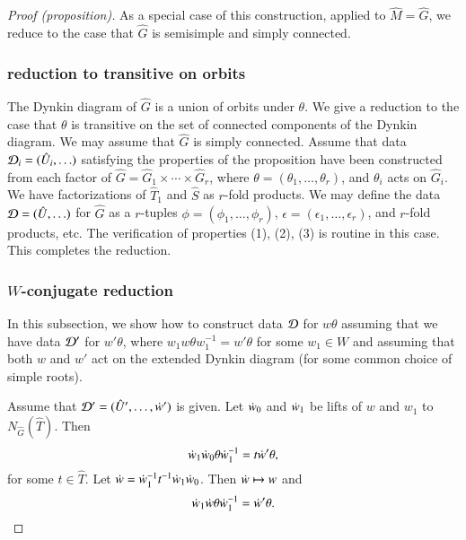 \begin{proof}[Proof (proposition)]
As a special case of this construction, applied to $\hat M=\hat G$, we reduce
to the case that $\hat G$ is semisimple and simply connected.

\subsubsection{reduction to transitive on orbits}

  The Dynkin diagram of $\hat G$ is a union of orbits under $\theta$.
  We give a reduction to the case that $\theta$ is transitive on
  the set of connected components of the Dynkin diagram. We may assume
  that $\hat G$ is simply connected.
  Assume that data $\mathcal D_i=(\hat U_i,\ldots)$ satisfying the properties of the
  proposition have been
  constructed from each factor of
  $\hat G = \hat G_1\times\cdots\times \hat G_r$, where $\theta=(\theta_1,\ldots,\theta_r)$,
  and $\theta_i$ acts on $\hat G_i$.  We have
  factorizations of $\hat T_1$ and $\hat S$ as $r$-fold products.  We
  may define the data $\mathcal D=(\hat U,\ldots)$ for $\hat G$ as a
  $r$-tuples $\phi = (\phi_1,\ldots,\phi_r)$,
  $\epsilon = (\epsilon_{1},\ldots,\epsilon_{r})$, and $r$-fold products, etc.  The
  verification of properties (1), (2), (3) is routine in this case.
  This completes the reduction.

\subsubsection{$W$-conjugate reduction}\label{sec:conjred}

In this subsection, we show how to construct data $\mathcal D$ for $w\theta$
assuming that we have data $\mathcal D'$ for $w'\theta$, where $w_1w\theta w_1^{-1}=w'\theta$
for some $w_1\in W$ and assuming that both $w$ and $w'$ act on the extended
Dynkin diagram (for some common choice of simple roots).


Assume that $\mathcal D' =(\hat U',\ldots,\dot w')$ is given.
Let $\dot w_0$ and $\dot w_1$ be lifts of $w$ and $w_1$ to $N_{\hat
  G}(\hat T)$.  Then
\[
\dot w_1 \dot w_0 \theta\dot w_1^{-1} = t \dot w'\theta,
\]
for some $t\in \hat T$.  Let $\dot w = \dot w_1^{-1} t^{-1}
\dot w_1\dot w_0$.  Then $\dot w\mapsto w$ and
\begin{equation}\label{eqn:outer}
\dot w_1\dot w \theta\dot w_1^{-1} = \dot w'\theta.
\end{equation}


\end{proof}
